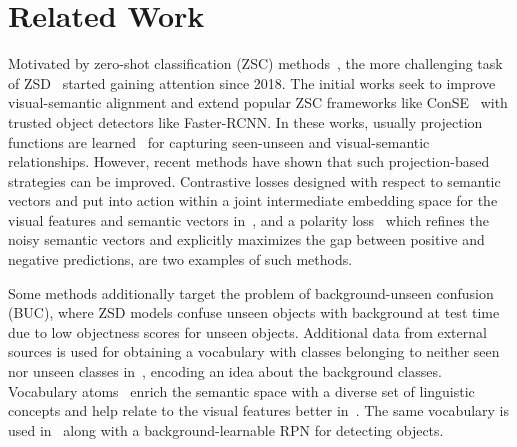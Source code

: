 \documentclass{bmvc2k}
\begin{document}
\section{Related Work}
\label{sec:related}








Motivated by zero-shot classification (ZSC) methods~\cite{rohrbach2010helps, rohrbach2011evaluating, kankuekul2012online, akata2015label, frome2013devise, akata2015evaluation, romera2015embarrassingly, kodirov2017semantic, xian2016latent, zhang2015zero, changpinyo2016synthesized, norouzi2013zero, zhu2019learning, vyas2020leveraging, schonfeld2019generalized, narayan2020latent, mishra2018generative, xian2018feature, xian2019f, feng2020transfer, tang2021zero, liu2020novel, Thong2020BiasGZSL, huang2020multi}, the more challenging task of ZSD~\cite{rahman2018zero, bansal2018zero, zhu2019zero, Demirel2018ZeroShotOD} started gaining attention since 2018. The initial works seek to improve visual-semantic alignment and extend popular ZSC frameworks like ConSE~\cite{norouzi2013zero} with trusted object detectors like Faster-RCNN. In these works, usually projection functions are learned~\cite{rahman2018zero, Demirel2018ZeroShotOD, mao2020zero} for capturing seen-unseen and visual-semantic relationships. However, recent methods have shown that such projection-based strategies can be improved. Contrastive losses designed with respect to semantic vectors and put into action within a joint intermediate embedding space for the visual features and semantic vectors in~\cite{yan2022semantics}, and a polarity loss~\cite{rahman2018polarity} which refines the noisy semantic vectors and explicitly maximizes the gap between positive and negative predictions, are two examples of such methods. 

Some methods additionally target the problem of background-unseen confusion (BUC), where ZSD models confuse unseen objects with background at test time due to low objectness scores for unseen objects. Additional data from external sources is used for obtaining a vocabulary with classes belonging to neither seen nor unseen classes in~\cite{bansal2018zero}, encoding an idea about the background classes. Vocabulary atoms~\cite{chua2009nus} enrich the semantic space with a diverse set of linguistic concepts and help relate to the visual features better in~\cite{rahman2018polarity}. The same vocabulary is used in~\cite{zheng2020background} along with a background-learnable RPN for detecting objects.
\end{document}
